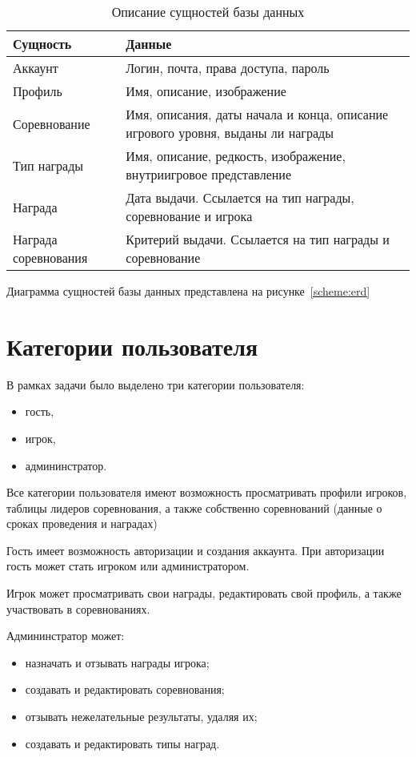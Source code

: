 \begin{table}[h!]
	\caption{\label{tbl:dataop}Описание сущностей базы данных}
	\begin{tabular}{|l|l|}
		\hline
		Сущность & Данные \\\hline
		Аккаунт & Логин, почта, права доступа, пароль \\\hline
		Профиль & Имя, описание, изображение \\\hline
		Соревнование & Имя, описания, даты начала и конца, описание игрового уровня, выданы ли награды \\\hline
		Тип награды & Имя, описание, редкость, изображение, внутриигровое представление\\\hline
		Награда & Дата выдачи. Ссылается на тип награды, соревнование и игрока \\\hline
		Награда соревнования & Критерий выдачи. Ссылается на тип награды и соревнование\\\hline
	\end{tabular}
\end{table}
\FloatBarrier
Диаграмма сущностей базы данных представлена на рисунке~\ref{scheme:erd}

\FloatBarrier
\section{Категории пользователя}

В рамках задачи было выделено три категории пользователя:
\begin{itemize}
	\item гость,
	\item игрок,
	\item админинстратор.
\end{itemize}

Все категории пользователя имеют возможность просматривать профили игроков, таблицы лидеров соревнования, а также собственно соревнований (данные о сроках проведения и наградах)

Гость имеет возможность авторизации и создания аккаунта. При авторизации гость может стать игроком или администратором.

Игрок может просматривать свои награды, редактировать свой профиль, а также участвовать в соревнованиях.

Админинстратор может:
\begin{itemize}
	\item назначать и отзывать награды игрока;
	\item создавать и редактировать соревнования;
	\item отзывать нежелательные результаты, удаляя их;
	\item создавать и редактировать типы наград.
\end{itemize}

